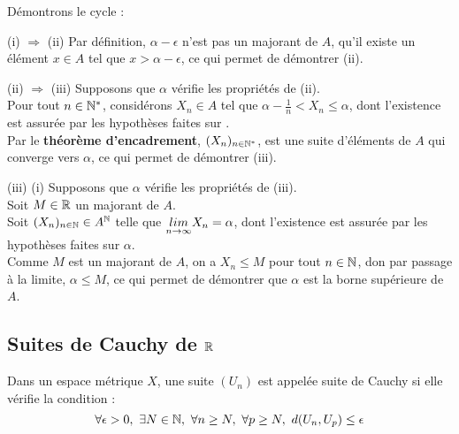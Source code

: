 \bpf
Démontrons le cycle : 
\bi
\item (i) $\Rightarrow$ (ii)  Par définition, $\alpha - \epsilon$ n'est pas un majorant de $A$, \ie qu'il existe un élément $x \in A$ tel que $x > \alpha - \epsilon$, ce qui permet de démontrer (ii).
\item (ii) $\Rightarrow$ (iii) Supposons que $\alpha$ vérifie les propriétés de (ii).\\
Pour tout $n \in \mathbb{N}^*$, considérons $X_n \in A$ tel que $\alpha - \frac1n < X_n \leq \alpha$, dont l'existence est assurée par les hypothèses faites sur \alpha.\\
Par le \textbf{théorème d'encadrement}, $(X_n)_{n\in\mathbb{N}^*}$, est une suite d'éléments de $A$ qui converge vers $\alpha$, ce qui permet de démontrer (iii).  
\item (iii) \Rightarrow (i) Supposons que $\alpha$ vérifie les propriétés de (iii).\\
Soit $M \in \mathbb{R}$ un majorant de $A$.\\
Soit $(X_n)_{n\in \mathbb{N}} \in A^{\mathbb{N}}$ telle que $\underset{n \to \infty}{lim} X_n = \alpha$, dont l'existence est assurée par les hypothèses faites sur $\alpha$.\\
Comme $M$ est un majorant de $A$, on a $X_n \leq M$ pour tout $n\in \mathbb{N}$, don par passage à la limite, $\alpha \leq M$, ce qui permet de démontrer que $\alpha$ est la borne supérieure de $A$.

\ei
\epf

\begin{center}
\end{center}

\subsection{Suites de Cauchy de $\mathbb{R}$}
 Dans un espace métrique $X$, une suite $(U_n)$ est appelée suite de Cauchy si elle vérifie la condition : 
$$\forall \epsilon > 0, ~ \exists N \in \mathbb{N}, ~ \forall n \geq N, ~ \forall p \geq N, ~ d(U_n, U_p) \leq \epsilon$$
\ed

